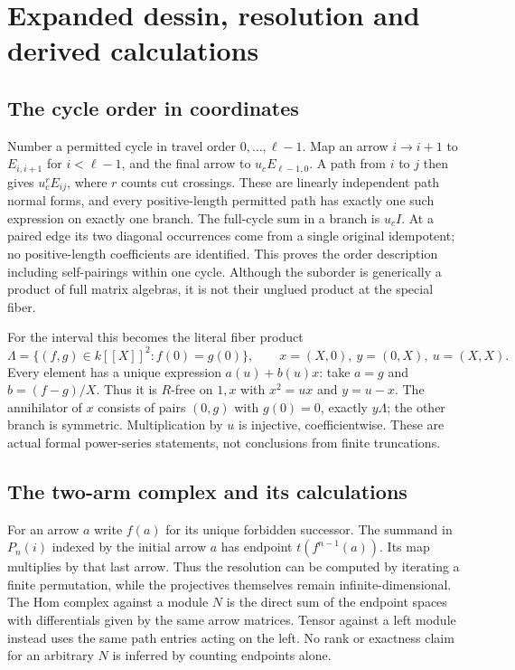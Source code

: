 \documentclass[11pt]{article}
\theoremstyle{definition}\newtheorem{definition}[theorem]{Definition}
\theoremstyle{remark}\newtheorem{remark}[theorem]{Remark}
\begin{document}
\section{Expanded dessin, resolution and derived calculations}
\subsection{The cycle order in coordinates}
Number a permitted cycle in travel order $0,\ldots,\ell-1$. Map an arrow $i\to i+1$ to $E_{i,i+1}$ for $i<\ell-1$, and the final arrow to $u_c E_{\ell-1,0}$. A path from $i$ to $j$ then gives $u_c^rE_{ij}$, where $r$ counts cut crossings. These are linearly independent path normal forms, and every positive-length permitted path has exactly one such expression on exactly one branch. The full-cycle sum in a branch is $u_c I$. At a paired edge its two diagonal occurrences come from a single original idempotent; no positive-length coefficients are identified. This proves the order description including self-pairings within one cycle. Although the suborder is generically a product of full matrix algebras, it is not their unglued product at the special fiber.

For the interval this becomes the literal fiber product
\[
 \Lambda=\{(f,g)\in k[[X]]^2:f(0)=g(0)\},\qquad
 x=(X,0),\ y=(0,X),\ u=(X,X).
\]
Every element has a unique expression $a(u)+b(u)x$: take $a=g$ and $b=(f-g)/X$. Thus it is $R$-free on $1,x$ with $x^2=ux$ and $y=u-x$. The annihilator of $x$ consists of pairs $(0,g)$ with $g(0)=0$, exactly $y\Lambda$; the other branch is symmetric. Multiplication by $u$ is injective, coefficientwise. These are actual formal power-series statements, not conclusions from finite truncations.

\subsection{The two-arm complex and its calculations}
For an arrow $a$ write $f(a)$ for its unique forbidden successor. The summand in $P_n(i)$ indexed by the initial arrow $a$ has endpoint $t(f^{n-1}(a))$. Its map multiplies by that last arrow. Thus the resolution can be computed by iterating a finite permutation, while the projectives themselves remain infinite-dimensional. The Hom complex against a module $N$ is the direct sum of the endpoint spaces with differentials given by the same arrow matrices. Tensor against a left module instead uses the same path entries acting on the left. No rank or exactness claim for an arbitrary $N$ is inferred by counting endpoints alone.
\end{document}
